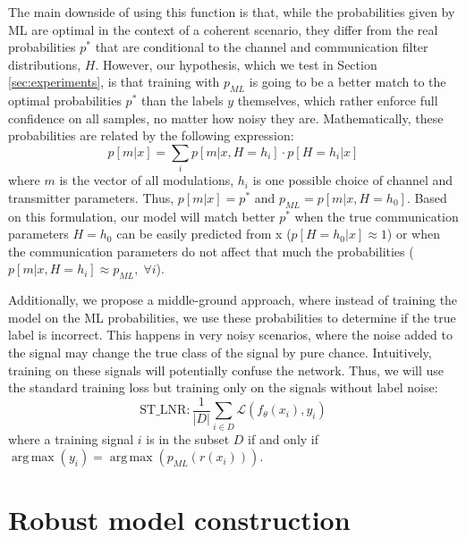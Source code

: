 \documentclass[conference]{IEEEtran}
\newcommand{\pf}[1]{{\textcolor{orange}{PF: {#1}}}}
\newcommand{\Ls}{\mathcal{L}}
\DeclareMathOperator*{\argmax}{arg\,max}
\begin{document}
The main downside of using this function is that, while the probabilities given by ML are optimal in the context of a coherent scenario, they differ from the real probabilities $p^{*}$ that are conditional to the channel and communication filter distributions, $H$. However, our hypothesis, which we test in Section \ref{sec:experiments}, is that training with $p_{ML}$ is going to be a better match to the optimal probabilities $p^{*}$ than the labels $y$ themselves, which rather enforce full confidence on all samples, no matter how noisy they are. Mathematically, these probabilities are related by the following expression:
\begin{equation}
	p[m|x] =  \sum_i p[m|x,H=h_i] \cdot p[H=h_i|x]
\end{equation}
where $m$ is the vector of all modulations, $h_i$ is one possible choice of channel and transmitter parameters. Thus, $p[m|x] = p^{*}$ and $p_{ML} = p[m|x,H=h_0]$. Based on this formulation, our model will match better $p^{*}$ when the true communication parameters $H=h_0$ can be easily predicted from x ($p[H=h_0|x] \approx 1$) or when the communication parameters do not affect that much the probabilities ($p[m|x,H=h_i] \approx p_{ML}, \; \forall i$).

Additionally, we propose a middle-ground approach, where instead of training the model on the ML probabilities, we use these probabilities to determine if the true label is incorrect. This happens in very noisy scenarios, where the noise added to the signal may change the true class of the signal by pure chance. Intuitively, training on these signals will potentially confuse the network. Thus, we will use the standard training loss but training only on the signals without label noise:
\begin{equation}
    \text{ST\_LNR} : \dfrac{1}{|D|}\sum_{i \in D}\Ls(f_{\theta}(x_i), y_i)
\end{equation}
where a training signal $i$ is in the subset $D$ if and only if $\argmax(y_i) = \argmax(p_{ML}(r(x_i)))$.


\section{Robust model construction}

\end{document}
